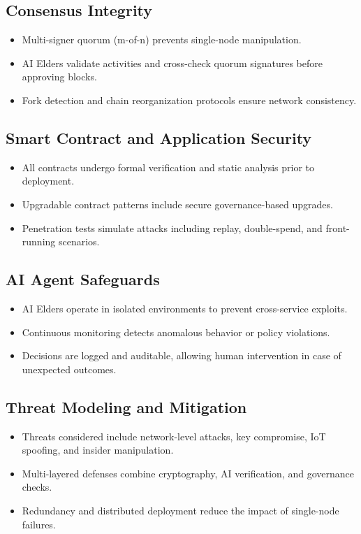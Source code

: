\documentclass[11pt,a4paper]{article}
\begin{document}
\subsection{Consensus Integrity}
\begin{itemize}
    \item Multi-signer quorum (m-of-n) prevents single-node manipulation.  
    \item AI Elders validate activities and cross-check quorum signatures before approving blocks.  
    \item Fork detection and chain reorganization protocols ensure network consistency.  
\end{itemize}

\subsection{Smart Contract and Application Security}
\begin{itemize}
    \item All contracts undergo formal verification and static analysis prior to deployment.  
    \item Upgradable contract patterns include secure governance-based upgrades.  
    \item Penetration tests simulate attacks including replay, double-spend, and front-running scenarios.  
\end{itemize}

\subsection{AI Agent Safeguards}
\begin{itemize}
    \item AI Elders operate in isolated environments to prevent cross-service exploits.  
    \item Continuous monitoring detects anomalous behavior or policy violations.  
    \item Decisions are logged and auditable, allowing human intervention in case of unexpected outcomes.  
\end{itemize}

\subsection{Threat Modeling and Mitigation}
\begin{itemize}
    \item Threats considered include network-level attacks, key compromise, IoT spoofing, and insider manipulation.  
    \item Multi-layered defenses combine cryptography, AI verification, and governance checks.  
    \item Redundancy and distributed deployment reduce the impact of single-node failures.  
\end{itemize}
\end{document}
